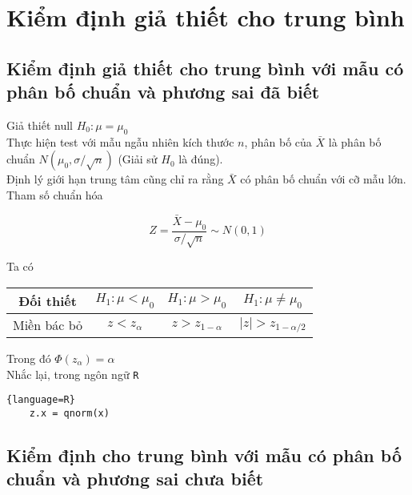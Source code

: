 \chapter{Kiểm định giả thiết cho trung bình}

\section{Kiểm định giả thiết cho trung bình với mẫu có phân bố chuẩn và phương sai đã biết}
Giả thiết null $H_0: \mu = \mu_0$ \\
Thực hiện test với mẫu ngẫu nhiên kích thước $n$, phân bố của $\bar{X}$ là phân bố chuẩn $N(\mu_0, \sigma / \sqrt{n})$
(Giải sử $H_0$ là đúng). \\
Định lý giới hạn trung tâm cũng chỉ ra rằng $\bar{X}$ có phân bố chuẩn với cỡ mẫu lớn. \\
Tham số chuẩn hóa 

\begin{equation}
    Z = \frac{\bar{X} - \mu_0}{\sigma / \sqrt{n}} \sim N(0, 1)
\end{equation}

Ta có

\begin{center}
    \begin{tabular}{| c | c | c | c |}
        \hline
        Đối thiết & $H_1: \mu < \mu_0$ & $H_1: \mu > \mu_0$ & $H_1: \mu \neq \mu_0$ \\
        \hline
        Miền bác bỏ & $z < z_{\alpha}$ & $z > z_{1-\alpha}$ & $\lvert z \rvert > z_{1 - \alpha / 2}$ \\
        \hline
    \end{tabular}
\end{center}

Trong đó $\Phi(z_\alpha) = \alpha$ \\
Nhắc lại, trong ngôn ngữ \lstinline{R}
\begin{lstlisting}{language=R}
    z.x = qnorm(x)
\end{lstlisting}



\section{Kiểm định cho trung bình với mẫu có phân bố chuẩn và phương sai chưa biết}

